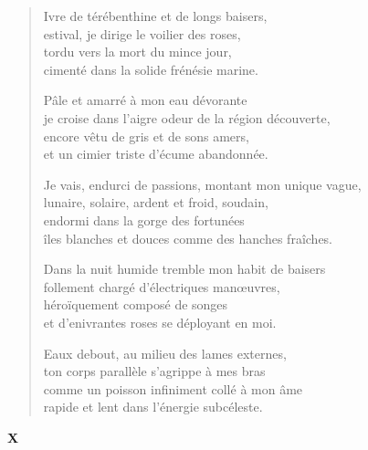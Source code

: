 \documentclass[11pt,a4paper]{book}
\begin{document}
\begin{verse}
  Ivre de térébenthine et de longs baisers, \\
  estival, je dirige le voilier des roses, \\
  tordu vers la mort du mince jour, \\
  cimenté dans la solide frénésie marine.

  Pâle et amarré à mon eau dévorante \\
  je croise dans l'aigre odeur de la région découverte, \\
  encore vêtu de gris et de sons amers, \\
  et un cimier triste d'écume abandonnée.

  Je vais, endurci de passions, montant mon unique vague, \\
  lunaire, solaire, ardent et froid, soudain, \\
  endormi dans la gorge des fortunées \\
  îles blanches et douces comme des hanches fraîches.

  Dans la nuit humide tremble mon habit de baisers \\
  follement chargé d'électriques manœuvres, \\
  héroïquement composé de songes \\
  et d'enivrantes roses se déployant en moi.

  Eaux debout, au milieu des lames externes, \\
  ton corps parallèle s'agrippe à mes bras \\
  comme un poisson infiniment collé à mon âme \\
  rapide et lent dans l'énergie subcéleste.
\end{verse}

\newpage


\begin{center} \textbf{X} \end{center}

\bigskip
\end{document}

